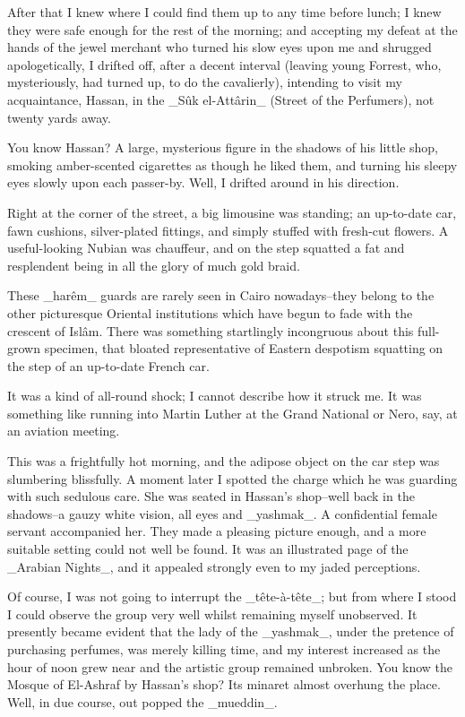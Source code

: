 After that I knew where I could find them up to any time before lunch;
I knew they were safe enough for the rest of the morning; and accepting
my defeat at the hands of the jewel merchant who turned his slow eyes
upon me and shrugged apologetically, I drifted off, after a decent
interval (leaving young Forrest, who, mysteriously, had turned up, to
do the cavalierly), intending to visit my acquaintance, Hassan, in the
_Sûk el-Attârin_ (Street of the Perfumers), not twenty yards away.

You know Hassan? A large, mysterious figure in the shadows of his
little shop, smoking amber-scented cigarettes as though he liked them,
and turning his sleepy eyes slowly upon each passer-by. Well, I
drifted around in his direction.

Right at the corner of the street, a big limousine was standing; an
up-to-date car, fawn cushions, silver-plated fittings, and simply
stuffed with fresh-cut flowers. A useful-looking Nubian was chauffeur,
and on the step squatted a fat and resplendent being in all the glory
of much gold braid.

These _harêm_ guards are rarely seen in Cairo nowadays--they belong
to the other picturesque Oriental institutions which have begun to
fade with the crescent of Islâm. There was something startlingly
incongruous about this full-grown specimen, that bloated
representative of Eastern despotism squatting on the step of an
up-to-date French car.

It was a kind of all-round shock; I cannot describe how it struck me.
It was something like running into Martin Luther at the Grand National
or Nero, say, at an aviation meeting.

This was a frightfully hot morning, and the adipose object on the car
step was slumbering blissfully. A moment later I spotted the charge
which he was guarding with such sedulous care. She was seated in
Hassan's shop--well back in the shadows--a gauzy white vision, all
eyes and _yashmak_. A confidential female servant accompanied her.
They made a pleasing picture enough, and a more suitable setting could
not well be found. It was an illustrated page of the _Arabian Nights_,
and it appealed strongly even to my jaded perceptions.

Of course, I was not going to interrupt the _tête-à-tête_; but from
where I stood I could observe the group very well whilst remaining
myself unobserved. It presently became evident that the lady of the
_yashmak_, under the pretence of purchasing perfumes, was merely
killing time, and my interest increased as the hour of noon grew near
and the artistic group remained unbroken. You know the Mosque of
El-Ashraf by Hassan's shop? Its minaret almost overhung the place.
Well, in due course, out popped the _mueddin_.

